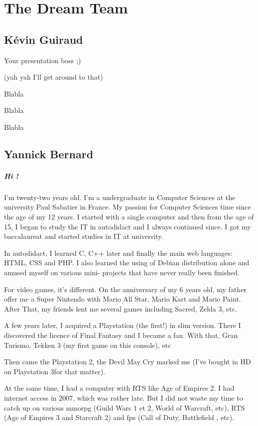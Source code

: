 \documentclass[a4paper,12pt]{book}
\begin{document}
\chapter{The Dream Team}
\section*{K\'{e}vin Guiraud}
Your presentation boss ;)

(yah yah I'll get around to that)

Blabla

Blabla

Blabla
\section*{Yannick Bernard}
\paragraph{Hi !} I'm twenty-two years old. I'm a undergraduate in Computer Sciences at the university Paul Sabatier in France. My passion for Computer Sciences time since the age of my 12 years. I started with a single computer and then from the age of 15, I began to study the IT in autodidact and I always continued since. I got my baccalaureat and started studies in IT at university.

In autodidact, I learned C, C++ later and finally the main web languages: HTML, CSS and PHP. I also learned the using of Debian distribution alone and amused myself on various mini- projects that have never really been finished.

For video games, it's different. On the anniversary of my 6 years old, my father offer me a Super Nintendo with Mario All Star, Mario Kart and Mario Paint. After That, my friends lent me several games including Sacred, Zelda 3, etc.

A few years later, I acquired a Playstation (the first!) in slim version. There I discovered the licence of Final Fantasy and I became a fan. With that, Gran Turismo, Tekken 3 (my first game on this console), etc

Then came the Playstation 2, the Devil May Cry marked me (I've bought in HD on Playstation 3for that matter).

At the same time, I had a computer with RTS like Age of Empires 2. I had internet access in 2007, which was rather late. But I did not waste my time to catch up on various mmorpg (Guild Wars 1 et 2, World of Warcraft, etc), RTS (Age of Empires 3 and Starcraft 2) and fps (Call of Duty, Battlefield , etc).
\end{document}
